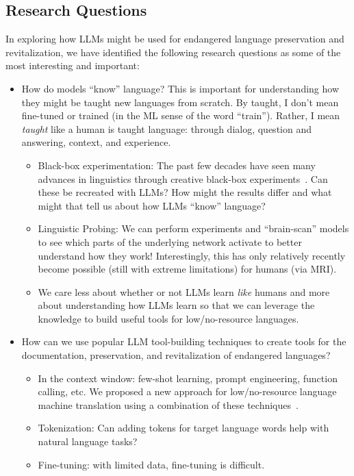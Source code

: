 \documentclass{article}
\begin{document}
\subsection*{Research Questions}
In exploring how LLMs might be used for endangered language preservation and revitalization, we have identified the following research questions as some of the most interesting and important:
\begin{itemize}
    \item How do models ``know'' language? This is important for understanding how they might be taught new languages from scratch. By taught, I don't mean fine-tuned or trained (in the ML sense of the word ``train''). Rather, I mean \textit{taught} like a human is taught language: through dialog, question and answering, context, and experience.
    \begin{itemize}
        \item Black-box experimentation: The past few decades have seen many advances in linguistics through creative black-box experiments~\cite{atoms,through-the-language-glass,language-instinct}. Can these be recreated with LLMs? How might the results differ and what might that tell us about how LLMs ``know'' language?
        \item Linguistic Probing: We can perform experiments and ``brain-scan'' models to see which parts of the underlying network activate to better understand how they work! Interestingly, this has only relatively recently become possible (still with extreme limitations) for humans (via MRI).
        \item We care less about whether or not LLMs learn \textit{like} humans and more about understanding how LLMs learn so that we can leverage the knowledge to build useful tools for low/no-resource languages.
    \end{itemize}
    \item How can we use popular LLM tool-building techniques to create tools for the documentation, preservation, and revitalization of endangered languages?
    \begin{itemize}
        \item In the context window: few-shot learning, prompt engineering, function calling, etc. We proposed a new approach for low/no-resource language machine translation using a combination of these techniques~\cite{llm-rbmt}.
        \item Tokenization: Can adding tokens for target language words help with natural language tasks?
        \item Fine-tuning: with limited data, fine-tuning is difficult.

\end{itemize}
\end{itemize}
\end{document}
